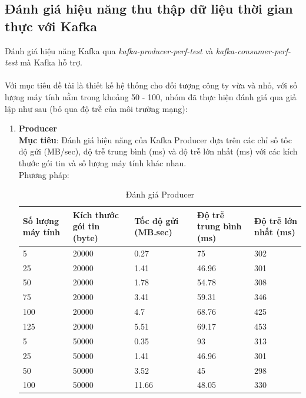 \subsection{Đánh giá hiệu năng thu thập dữ liệu thời gian thực với Kafka}
\noindent Đánh giá hiệu năng Kafka qua \textit{kafka-producer-perf-test} và \textit{kafka-consumer-perf-test} mà Kafka hỗ trợ.\\ \\
Với mục tiêu đề tài là thiết kế hệ thống cho đối tượng công ty vừa và nhỏ, với số lượng máy tính nằm trong khoảng 50 - 100, nhóm đã thực hiện đánh giá qua giả lập như sau (bỏ qua độ trễ của môi trường mạng):
\begin{enumerate}
    \item \textbf{Producer}\\
        \textbf{Mục tiêu}: Đánh giá hiệu năng của Kafka Producer dựa trên các chỉ số tốc độ gửi (MB/sec), độ trễ trung bình (ms) và độ trễ lớn nhất (ms) với các kích thước gói tin và số lượng máy tính khác nhau.\\
        Phương pháp: 
        \begin{longtable}{|p{}|p{}|p{}|p{}|p{}|}
            \caption{Đánh giá Producer}\\
            \hline
            \textbf{Số lượng máy tính} & \textbf{Kích thước gói tin (byte)} & \textbf{Tốc độ gửi (MB.sec)} & \textbf{Độ trễ trung bình (ms)} & \textbf{Độ trễ lớn nhất (ms)} \\
            \hline
            5 & 20000 & 0.27 & 75 & 302\\
            \hline
            25 & 20000 & 1.41 & 46.96 & 301\\
            \hline
            50 & 20000 & 1.78 & 54.78 & 308\\
            \hline
            75 & 20000 & 3.41 & 59.31 & 346\\
            \hline
            100 & 20000 & 4.7 & 68.76 & 425\\
            \hline
            125 & 20000 & 5.51 & 69.17 & 453\\
            \hline
             5 & 50000 & 0.35 & 93 & 313\\
            \hline
            25 & 50000 & 1.41 & 46.96 & 301\\
            \hline
            50 & 50000 & 3.52 & 45 & 298\\
            \hline
            100 & 50000 & 11.66 & 48.05 & 330\\

\end{longtable}
\end{enumerate}
